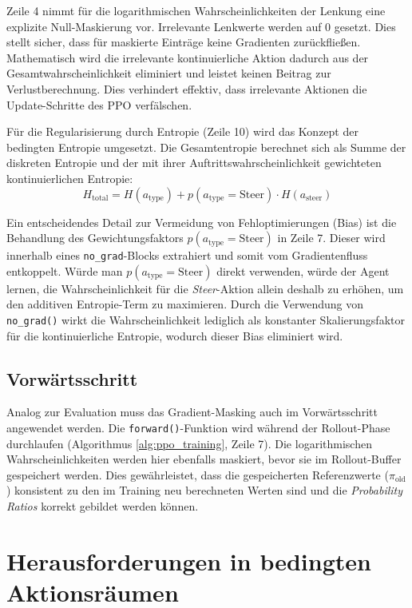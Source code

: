 Zeile 4 nimmt für die logarithmischen Wahrscheinlichkeiten der Lenkung eine explizite Null\hyp{}Maskierung vor. Irrelevante Lenkwerte werden auf 0 gesetzt. 
Dies stellt sicher, dass für maskierte Einträge keine Gradienten zurückfließen.
Mathematisch wird die irrelevante kontinuierliche Aktion dadurch aus der Gesamtwahrscheinlichkeit eliminiert und leistet keinen Beitrag zur Verlustberechnung. Dies verhindert effektiv, dass irrelevante Aktionen die Update\hyp{}Schritte des \ac{PPO} verfälschen.
\medskip

Für die Regularisierung durch Entropie (Zeile 10) wird das Konzept der bedingten Entropie umgesetzt. Die Gesamtentropie berechnet sich als Summe der diskreten Entropie und der mit ihrer Auftrittswahrscheinlichkeit gewichteten kontinuierlichen Entropie:
\begin{equation}
    H_{\text{total}} = H(a_{\text{type}}) + p(a_{\text{type}}=\text{Steer}) \cdot H(a_{\text{steer}})
\end{equation}

Ein entscheidendes Detail zur Vermeidung von Fehloptimierungen (Bias) ist die Behandlung des Gewichtungsfaktors $p(a_{\text{type}}=\text{Steer})$ in Zeile 7. Dieser wird innerhalb eines \texttt{no\_grad}\hyp{}Blocks extrahiert und somit vom Gradientenfluss entkoppelt.
Würde man $p(a_{\text{type}}=\text{Steer})$ direkt verwenden, würde der Agent lernen, die Wahrscheinlichkeit für die \emph{Steer}\hyp{}Aktion allein deshalb zu erhöhen, um den additiven Entropie\hyp{}Term zu maximieren.
Durch die Verwendung von \texttt{no\_grad()} wirkt die Wahrscheinlichkeit lediglich als konstanter Skalierungsfaktor für die kontinuierliche Entropie, wodurch dieser Bias eliminiert wird.

\subsection*{Vorwärtsschritt}
Analog zur Evaluation muss das Gradient\hyp{}Masking auch im Vorwärtsschritt angewendet werden. Die \texttt{forward()}\hyp{}Funktion wird während der Rollout\hyp{}Phase durchlaufen (Algorithmus \ref{alg:ppo_training}, Zeile 7). Die logarithmischen Wahrscheinlichkeiten werden hier ebenfalls maskiert, bevor sie im Rollout\hyp{}Buffer gespeichert werden. Dies gewährleistet, dass die gespeicherten Referenzwerte ($\pi_{\text{old}}$) konsistent zu den im Training neu berechneten Werten sind und die \emph{Probability Ratios} korrekt gebildet werden können.

\section{Herausforderungen in bedingten Aktionsräumen}
\label{sc:Herausforderungen_bedingte_Aktionsräume}

